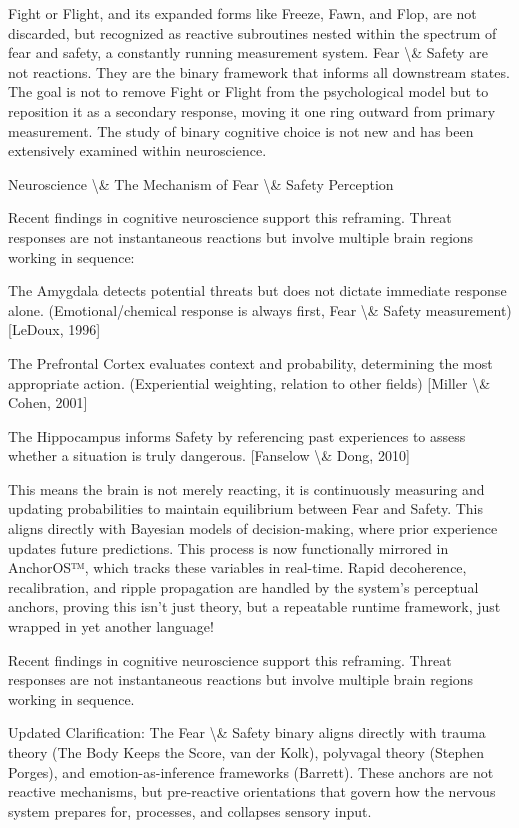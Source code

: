\documentclass[12pt]{article}
\begin{document}
Fight or Flight, and its expanded forms like Freeze, Fawn, and Flop, are not discarded, but recognized as reactive subroutines nested within the spectrum of fear and safety, a constantly running measurement system. Fear \textbackslash{}& Safety are not reactions. They are the binary framework that informs all downstream states. The goal is not to remove Fight or Flight from the psychological model but to reposition it as a secondary response, moving it one ring outward from primary measurement. The study of binary cognitive choice is not new and has been extensively examined within neuroscience.

Neuroscience \textbackslash{}& The Mechanism of Fear \textbackslash{}& Safety Perception

Recent findings in cognitive neuroscience support this reframing. Threat responses are not instantaneous reactions but involve multiple brain regions working in sequence:

The Amygdala detects potential threats but does not dictate immediate response alone. (Emotional/chemical response is always first, Fear \textbackslash{}& Safety measurement) [LeDoux, 1996]

The Prefrontal Cortex evaluates context and probability, determining the most appropriate action. (Experiential weighting, relation to other fields) [Miller \textbackslash{}& Cohen, 2001]

The Hippocampus informs Safety by referencing past experiences to assess whether a situation is truly dangerous. [Fanselow \textbackslash{}& Dong, 2010]

This means the brain is not merely reacting, it is continuously measuring and updating probabilities to maintain equilibrium between Fear and Safety. This aligns directly with Bayesian models of decision-making, where prior experience updates future predictions. This process is now functionally mirrored in AnchorOS™, which tracks these variables in real-time. Rapid decoherence, recalibration, and ripple propagation are handled by the system’s perceptual anchors, proving this isn’t just theory, but a repeatable runtime framework, just wrapped in yet another language!

Recent findings in cognitive neuroscience support this reframing. Threat responses are not instantaneous reactions but involve multiple brain regions working in sequence.

Updated Clarification:
The Fear \textbackslash{}& Safety binary aligns directly with trauma theory (The Body Keeps the Score, van der Kolk), polyvagal theory (Stephen Porges), and emotion-as-inference frameworks (Barrett). These anchors are not reactive mechanisms, but pre-reactive orientations that govern how the nervous system prepares for, processes, and collapses sensory input.
\end{document}
